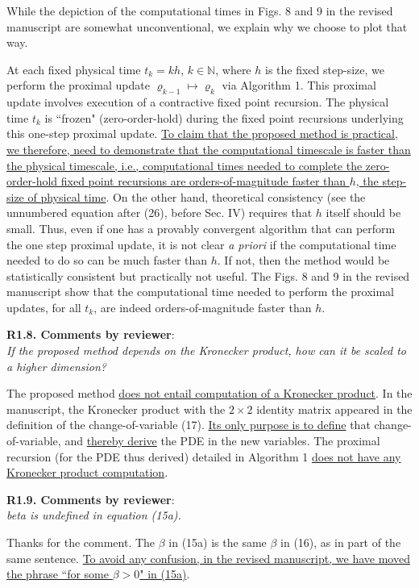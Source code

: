 \documentclass[12pt,onecolumn]{IEEEtran}
\newcommand{\blue}{\color{blue}}
\newcommand{\nib}{\noindent  {\bf Response:} }
\begin{document}
{\nib{ \blue While the depiction of the computational times in Figs. 8 and 9 in the revised manuscript are somewhat unconventional, we explain why we choose to plot that way. 

At each fixed physical time $t_{k}=kh$, $k\in\mathbb{N}$, where $h$ is the fixed step-size, we perform the proximal update $\varrho_{k-1}\mapsto\varrho_{k}$ via Algorithm 1. This proximal update involves execution of a contractive fixed point recursion. The physical time $t_{k}$ is ``frozen" (zero-order-hold) during the fixed point recursions underlying this one-step proximal update. \ul{To claim that the proposed method is practical, we therefore, need to demonstrate that the computational timescale is faster than the physical timescale, i.e., computational times needed to complete the zero-order-hold fixed point recursions are orders-of-magnitude faster than $h$, the step-size of physical time}. On the other hand, theoretical consistency (see the unnumbered equation after (26), before Sec. IV) requires that $h$ itself should be small. Thus, even if one has a provably convergent algorithm that can perform the one step proximal update, it is not clear \emph{a priori} if the computational time needed to do so can be much faster than $h$. If not, then the method would be statistically consistent but practically not useful. The Figs. 8 and 9 in the revised manuscript show that the computational time needed to perform the proximal updates, for all $t_{k}$, are indeed orders-of-magnitude faster than $h$.}}


\noindent
{\bf R1.8. Comments by reviewer}:\\
{\em If the proposed method depends on the Kronecker product, how can it be scaled to a higher dimension?}

{\nib{ \blue The proposed method \ul{does not entail computation of a Kronecker product}. In the manuscript, the Kronecker product with the $2\times 2$ identity matrix appeared in the definition of the change-of-variable (17). \ul{Its only purpose is to define} that change-of-variable, and \ul{thereby derive} the PDE in the new variables. The proximal recursion (for the PDE thus derived) detailed in Algorithm 1 \ul{does not have any Kronecker product computation}.}}


\noindent
{\bf R1.9. Comments by reviewer}:\\
{\em beta is undefined in equation (15a).}

{\nib{ \blue Thanks for the comment. The $\beta$ in (15a) is the same $\beta$ in (16), as in part of the same sentence. \ul{To avoid any confusion, in the revised manuscript, we have moved the phrase ``for some $\beta>0$" in (15a)}.}}
\end{document}
